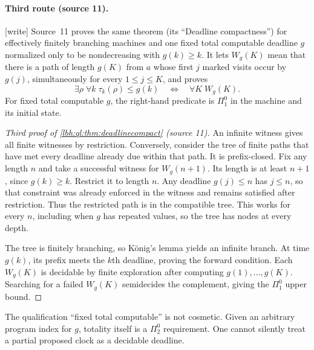 \documentclass[11pt,letterpaper]{article}
\theoremstyle{definition}
\theoremstyle{remark}
\newcommand{\1}{\mathbf 1}
\newcommand{\wtag}{\textup{[write]}}%
\begin{document}
\paragraph{Third route (source 11).}
\wtag{} Source~11 proves the same theorem (its ``Deadline compactness'') for effectively
finitely branching machines and one fixed total computable deadline $g$ normalized only to be
nondecreasing with $g(k)\geq k$. It lets $W_g(K)$ mean that there is a path of length $g(K)$
from $a$ whose first $j$ marked visits occur by $g(j)$, simultaneously for every $1\leq j\leq K$,
and proves
\begin{equation}\label{lbh:ql:eq:deadlinecompact}
 \exists\rho\;\forall k\;\tau_k(\rho)\leq g(k)
 \quad\Longleftrightarrow\quad
 \forall K\;W_g(K).
\end{equation}
For fixed total computable $g$, the right-hand predicate is $\Pi^0_1$ in the
machine and its initial state.
\begin{proof}[Third proof of \cref{lbh:ql:thm:deadlinecompact} (source 11)]
An infinite witness gives all finite witnesses by restriction. Conversely,
consider the tree of finite paths that have met every deadline already due
within that path. It is prefix-closed. Fix any length $n$ and take a successful
witness for $W_g(n+1)$. Its length is at least $n+1$, since $g(k)\geq k$.
Restrict it to length $n$. Any deadline $g(j)\leq n$ has $j\leq n$, so that
constraint was already enforced in the witness and remains satisfied after
restriction. Thus the restricted path is in the compatible tree. This works
for every $n$, including when $g$ has repeated values, so the tree has nodes
at every depth.

The tree is finitely branching, so K\"onig's lemma yields an infinite branch.
At time $g(k)$, its prefix meets the $k$th deadline, proving the forward
condition. Each $W_g(K)$ is decidable by finite exploration after computing
$g(1),\ldots,g(K)$. Searching for a failed $W_g(K)$ semidecides the
complement, giving the $\Pi^0_1$ upper bound.
\end{proof}
The qualification ``fixed total computable'' is not cosmetic. Given an
arbitrary program index for $g$, totality itself is a $\Pi^0_2$ requirement.
One cannot silently treat a partial proposed clock as a decidable deadline.
\end{document}
